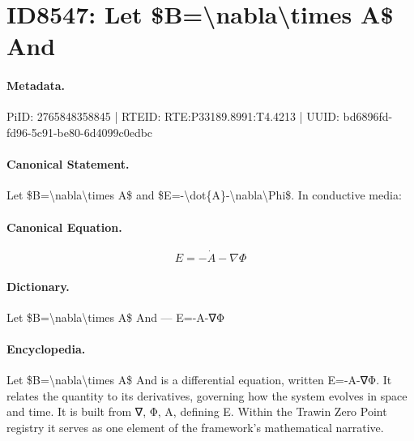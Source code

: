 \section*{ID8547: Let \$B=\textbackslash{}nabla\textbackslash{}times A\$ And}
\paragraph{Metadata.}
PiID: 2765848358845 | RTEID: RTE:P33189.8991:T4.4213 | UUID: bd6896fd-fd96-5c91-be80-6d4099c0edbc

\paragraph{Canonical Statement.}
Let \$B=\textbackslash{}nabla\textbackslash{}times A\$ and \$E=-\textbackslash{}dot\{A\}-\textbackslash{}nabla\textbackslash{}Phi\$. In conductive media:

\paragraph{Canonical Equation.}
\[
E=-\dot{A}-\nabla\Phi
\]

\paragraph{Dictionary.}
Let \$B=\textbackslash{}nabla\textbackslash{}times A\$ And — E=-A-∇Φ

\paragraph{Encyclopedia.}
Let \$B=\textbackslash{}nabla\textbackslash{}times A\$ And is a differential equation, written E=-A-∇Φ. It relates the quantity to its derivatives, governing how the system evolves in space and time. It is built from ∇, Φ, A, defining E. Within the Trawin Zero Point registry it serves as one element of the framework's mathematical narrative.
